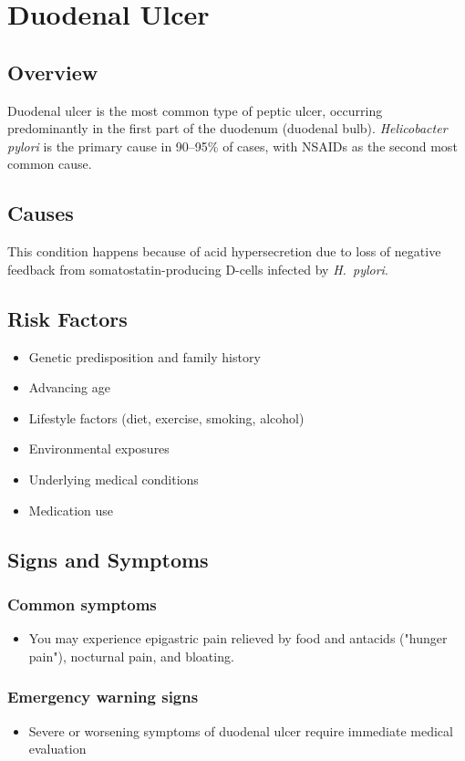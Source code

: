 \chapter{Duodenal Ulcer}
\label{sec:Duodenal Ulcer}

\section{Overview}
Duodenal ulcer is the most common type of peptic ulcer, occurring predominantly in the first part of the duodenum (duodenal bulb). \textit{Helicobacter pylori} is the primary cause in 90--95\% of cases, with NSAIDs as the second most common cause.
\section{Causes}
This condition happens because of acid hypersecretion due to loss of negative feedback from somatostatin-producing D-cells infected by \textit{H.~pylori}.     
\section{Risk Factors}

\begin{itemize}[noitemsep]
  \item Genetic predisposition and family history
  \item Advancing age
  \item Lifestyle factors (diet, exercise, smoking, alcohol)
  \item Environmental exposures
  \item Underlying medical conditions
  \item Medication use
\end{itemize}
\section{Signs and Symptoms}

\subsection{Common symptoms}
\begin{itemize}[noitemsep]
  \item You may experience epigastric pain relieved by food and antacids ("hunger pain"), nocturnal pain, and bloating. 
  \end{itemize}

\subsection{Emergency warning signs}
\begin{itemize}[noitemsep]
  \item Severe or worsening symptoms of duodenal ulcer require immediate medical evaluation
\end{itemize}
